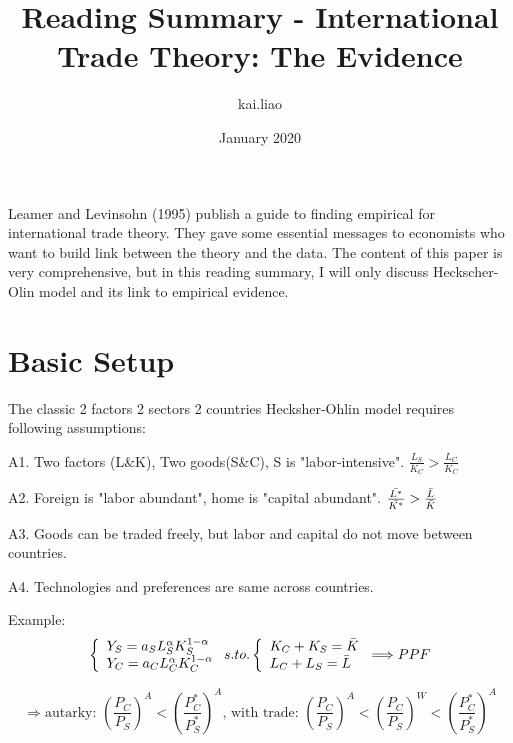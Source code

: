 \documentclass{article}
\title{Reading Summary - International Trade Theory: The Evidence}
\author{kai.liao }
\date{January 2020}
\begin{document}
\maketitle

\noindent Leamer and Levinsohn (1995) publish a guide to finding empirical for international trade theory. They gave some essential messages to economists who want to build link between the theory and the data. The content of this paper is very comprehensive, but in this reading summary, I will only discuss Heckscher-Olin model and its link to empirical evidence.

\section{Basic Setup}
The classic 2 factors 2 sectors 2 countries Hecksher-Ohlin model requires following assumptions: 

A1. Two factors (L\&K), Two goods(S\&C), S is "labor-intensive". $\frac{L_S}{K_C} > \frac{L_C}{K_C}$

A2. Foreign is "labor abundant", home is "capital abundant". $\frac{\Bar{L^*}}{\Bar{K^*}}>\frac{\Bar{L}}{\Bar{K}}$

A3. Goods can be traded freely, but labor and capital do not move between countries.

A4. Technologies and preferences are same across countries.

\noindent Example: \begin{equation*}
\left\{
             \begin{array}{lc}
             Y_S = a_SL_S^\alpha K_S^{1-\alpha}\\
             Y_C = a_CL_C^\alpha K_C^{1-\alpha}
             \end{array}
\right.
s.to.
\left\{
             \begin{array}{lc}
             K_C+K_S=\Bar{K}\\
             L_C+L_S=\Bar{L}
             \end{array}
\right.
\Longrightarrow PPF
\end{equation*}

\begin{equation*}
\Longrightarrow
             \text{autarky: }\left(\frac{P_C}{P_S}\right)^A<\left(\frac{P_C^*}{P_S^*}\right)^A
             \text{, with trade: }\left(\frac{P_C}{P_S}\right)^A<\left(\frac{P_C}{P_S}\right)^W<\left(\frac{P_C^*}{P_S^*}\right)^A
\end{equation*}
\end{document}
